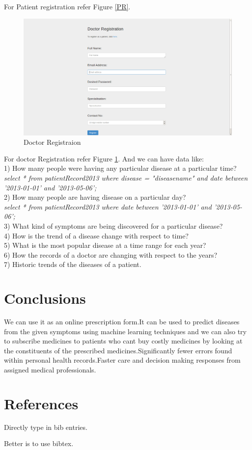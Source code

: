 \documentclass{article}
\begin{document}
For Patient registration refer Figure \ref{PR}.

\begin{figure}[!htbp]
	\centering
	\includegraphics[width=0.95\columnwidth]{doctor_reg.png}
	\caption{Doctor Registraion}
	\label{DR}
\end{figure}

For doctor Registration refer Figure \ref{DR}.
\newpage
And we can have data like:\\
1) How many people were having any particular disease at a particular time?\\
\textit{select * from patientRecord2013 where disease = "diseasename" and date between '2013-01-01' and '2013-05-06';}\\
2) How many people are having disease on a particular day?\\
\textit{select * from patientRecord2013 where date between '2013-01-01' and '2013-05-06';}\\
3) What kind of symptoms are being discovered for a particular disease?\\
4) How is the trend of a disease change with respect to time?\\
5) What is the most popular disease at a time range for each year?\\
6) How the records of a doctor are changing with respect to the years?\\
7) Historic trends of the diseases of a patient. \\

\section{Conclusions}

We can use it as an online prescription form.It can be used to predict diseases from the given symptoms using machine learning techniques and we can also try to subscribe medicines to patients who cant buy costly medicines by looking at the constituents of the prescribed medicines.Significantly fewer errors found within personal health records.Faster care and decision making responses from assigned medical professionals.


\section*{References}

Directly type in bib entries.

Better is to use bibtex.
\end{document}
